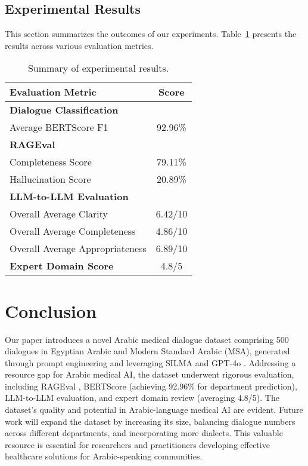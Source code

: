 \documentclass[manuscript,screen,review]{acmart}
\begin{document}
\subsection{Experimental Results}
This section summarizes the outcomes of our experiments. Table~\ref{tab:results} presents the results across various evaluation metrics.

\begin{table}[ht]
\centering
\caption{Summary of experimental results.}
\label{tab:results}
\begin{tabular}{l c}
\toprule
\textbf{Evaluation Metric} & \textbf{Score} \\
\midrule
\textbf{Dialogue Classification} & \\
Average BERTScore F1 & 92.96\% \\
\midrule
\textbf{RAGEval} & \\
Completeness Score & 79.11\% \\
Hallucination Score & 20.89\% \\
\midrule
\textbf{LLM-to-LLM Evaluation} & \\
Overall Average Clarity & 6.42/10 \\
Overall Average Completeness & 4.86/10 \\
Overall Average Appropriateness & 6.89/10 \\
\midrule
\textbf{Expert Domain Score} & 4.8/5 \\
\bottomrule
\end{tabular}
\end{table}





\section{Conclusion}



Our paper introduces a novel Arabic medical dialogue dataset comprising 500 dialogues in Egyptian Arabic and Modern Standard Arabic (MSA), generated through prompt engineering and leveraging SILMA \cite{silma_01_2024} and GPT-4o \cite{OpenAI_GPT4o_2024}. Addressing a resource gap for Arabic medical AI, the dataset underwent rigorous evaluation, including RAGEval \cite{zhu2024ragevalscenariospecificrag}, BERTScore \cite{zhang2020bertscoreevaluatingtextgeneration} (achieving 92.96\% for department prediction), LLM-to-LLM evaluation, and expert domain review (averaging 4.8/5).  The dataset's quality and potential in Arabic-language medical AI are evident. Future work will expand the dataset by increasing its size, balancing dialogue numbers across different departments, and incorporating more dialects. This valuable resource is essential for researchers and practitioners developing effective healthcare solutions for Arabic-speaking communities.
\end{document}
